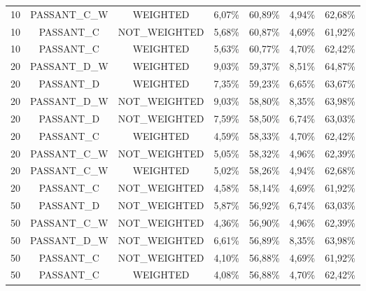 \begin{table}[H]
{\begin{tabular}{ccccccc}
	10 & PASSANT\_C\_W &   WEIGHTED &     6,07\% &    60,89\% &     4,94\% &    62,68\% \\
	
	10 &  PASSANT\_C & NOT\_WEIGHTED &     5,68\% &    60,87\% &     4,69\% &    61,92\% \\
	
	10 &  PASSANT\_C &   WEIGHTED &     5,63\% &    60,77\% &     4,70\% &    62,42\% \\
	
	20 & PASSANT\_D\_W &   WEIGHTED &     9,03\% &    59,37\% &     8,51\% &    64,87\% \\
	
	20 &  PASSANT\_D &   WEIGHTED &     7,35\% &    59,23\% &     6,65\% &    63,67\% \\
	
	20 & PASSANT\_D\_W & NOT\_WEIGHTED &     9,03\% &    58,80\% &     8,35\% &    63,98\% \\
	
	20 &  PASSANT\_D & NOT\_WEIGHTED &     7,59\% &    58,50\% &     6,74\% &    63,03\% \\
	
	20 &  PASSANT\_C &   WEIGHTED &     4,59\% &    58,33\% &     4,70\% &    62,42\% \\
	
	20 & PASSANT\_C\_W & NOT\_WEIGHTED &     5,05\% &    58,32\% &     4,96\% &    62,39\% \\
	
	20 & PASSANT\_C\_W &   WEIGHTED &     5,02\% &    58,26\% &     4,94\% &    62,68\% \\
	
	20 &  PASSANT\_C & NOT\_WEIGHTED &     4,58\% &    58,14\% &     4,69\% &    61,92\% \\
	
	50 &  PASSANT\_D & NOT\_WEIGHTED &     5,87\% &    56,92\% &     6,74\% &    63,03\% \\
	
	50 & PASSANT\_C\_W & NOT\_WEIGHTED &     4,36\% &    56,90\% &     4,96\% &    62,39\% \\
	
	50 & PASSANT\_D\_W & NOT\_WEIGHTED &     6,61\% &    56,89\% &     8,35\% &    63,98\% \\
	
	50 &  PASSANT\_C & NOT\_WEIGHTED &     4,10\% &    56,88\% &     4,69\% &    61,92\% \\
	
	50 &  PASSANT\_C &   WEIGHTED &     4,08\% &    56,88\% &     4,70\% &    62,42\% \\
	

\end{tabular}}
\end{table}

